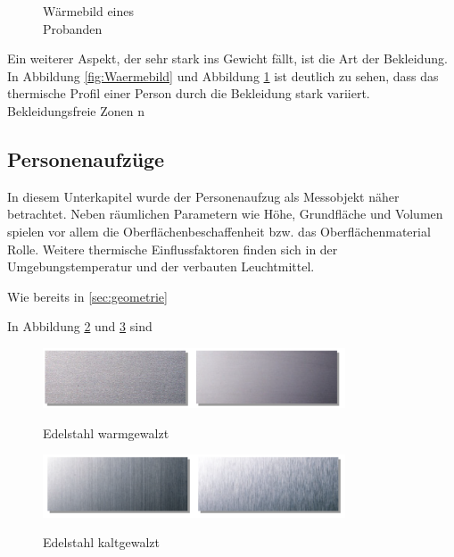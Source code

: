 \begin{figure}[H]
\begin{minipage}[b]{0.4\textwidth}
\label{fig:Waermebild2}
\caption[Wäermebild eines \\Probanden]{Wärmebild eines \\Probanden}

	\end{minipage}
	
\end{figure}

Ein weiterer Aspekt, der sehr stark ins Gewicht fällt, ist die Art der Bekleidung. In Abbildung \ref{fig:Waermebild} und Abbildung \ref{fig:Waermebild2} ist deutlich zu sehen, dass das thermische Profil einer Person durch die Bekleidung stark variiert. Bekleidungsfreie Zonen n 

\subsection{Personenaufzüge}

In diesem Unterkapitel wurde der Personenaufzug als Messobjekt näher betrachtet. Neben räumlichen Parametern wie Höhe, Grundfläche und Volumen spielen vor allem die Oberflächenbeschaffenheit bzw. das Oberflächenmaterial Rolle. Weitere thermische Einflussfaktoren finden sich in der Umgebungstemperatur und der verbauten Leuchtmittel.


Wie bereits in \ref{sec:geometrie}

In Abbildung \ref{fig:Edelstahlgewalzt} und \ref{fig:Edelstahlmatt} sind 
\begin{figure}[H]
	\centering
	\includegraphics[width=0.8\textwidth]
	{fig/Edelstahl_gewalzt.PNG}
	\caption[Edelstahl warmgewalzt]{Edelstahl warmgewalzt} \protect\cite{Edelstahl}
	\label{fig:Edelstahlgewalzt}
\end{figure}
\begin{figure}[H]
	\centering
	\includegraphics[width=0.8\textwidth]
	{fig/Edelstahl_matt.PNG}
	\caption[Edelstahl kaltgewalzt]{Edelstahl kaltgewalzt} \protect\cite{Edelstahl}
	\label{fig:Edelstahlmatt}	
\end{figure}





